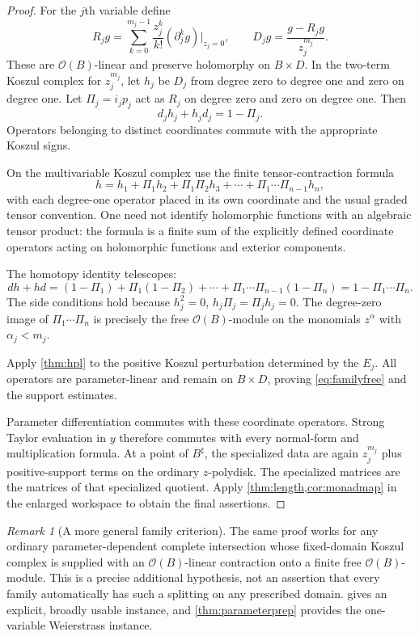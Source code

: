 \documentclass[11pt,letterpaper]{article}
\theoremstyle{definition}
\theoremstyle{remark}
\newtheorem{remark}[theorem]{Remark}
\newcommand{\OO}{\mathcal O}
\newcommand{\sh}{^{\sharp}}
\begin{document}
\begin{proof}
For the $j$th variable define
\[
 R_jg=\sum_{k=0}^{m_j-1}\frac{z_j^k}{k!}
           (\partial_j^kg)|_{z_j=0},\qquad
 D_jg=\frac{g-R_jg}{z_j^{m_j}}.
\]
These are $\OO(B)$-linear and preserve holomorphy on $B\times D$. In the two-term Koszul complex for $z_j^{m_j}$, let $h_j$ be $D_j$ from degree zero to degree one and zero on degree one. Let $\Pi_j=i_jp_j$ act as $R_j$ on degree zero and zero on degree one. Then
\[
 d_jh_j+h_jd_j=1-\Pi_j.
\]
Operators belonging to distinct coordinates commute with the appropriate Koszul signs.

On the multivariable Koszul complex use the finite tensor-contraction formula
\begin{equation}\label{eq:tensorh}
 h=h_1+\Pi_1h_2+\Pi_1\Pi_2h_3+\cdots+
             \Pi_1\cdots\Pi_{n-1}h_n,
\end{equation}
with each degree-one operator placed in its own coordinate and the usual graded tensor convention. One need not identify holomorphic functions with an algebraic tensor product: the formula is a finite sum of the explicitly defined coordinate operators acting on holomorphic functions and exterior components.

The homotopy identity telescopes:
\[
 dh+hd=(1-\Pi_1)+\Pi_1(1-\Pi_2)+\cdots+
         \Pi_1\cdots\Pi_{n-1}(1-\Pi_n)
       =1-\Pi_1\cdots\Pi_n.
\]
The side conditions hold because $h_j^2=0$, $h_j\Pi_j=\Pi_jh_j=0$. The degree-zero image of $\Pi_1\cdots\Pi_n$ is precisely the free $\OO(B)$-module on the monomials $z^\alpha$ with $\alpha_j<m_j$.

Apply \cref{thm:hpl} to the positive Koszul perturbation determined by the $E_j$. All operators are parameter-linear and remain on $B\times D$, proving \eqref{eq:familyfree} and the support estimates.

Parameter differentiation commutes with these coordinate operators. Strong Taylor evaluation in $y$ therefore commutes with every normal-form and multiplication formula. At a point of $B\sh$, the specialized data are again $z_j^{m_j}$ plus positive-support terms on the ordinary $z$-polydisk. The specialized matrices are the matrices of that specialized quotient. Apply \cref{thm:length,cor:monadmap} in the enlarged workspace to obtain the final assertions.
\end{proof}

\begin{remark}[A more general family criterion]
The same proof works for any ordinary parameter-dependent complete intersection whose fixed-domain Koszul complex is supplied with an $\OO(B)$-linear contraction onto a finite free $\OO(B)$-module. This is a precise additional hypothesis, not an assertion that every family automatically has such a splitting on any prescribed domain.  gives an explicit, broadly usable instance, and \cref{thm:parameterprep} provides the one-variable Weierstrass instance.
\end{remark}
\end{document}
